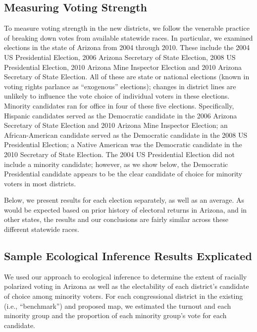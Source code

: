 \documentclass[12pt]{scrartcl}
\begin{document}
\subsection{Measuring Voting Strength}

To measure voting strength in the new districts, we follow the
venerable practice of breaking down votes from available statewide
races.  In particular, we examined elections in the state of Arizona
from 2004 through 2010. These include the 2004 US Presidential
Election, 2006 Arizona Secretary of State Election, 2008 US
Presidential Election, 2010 Arizona Mine Inspector Election and 2010
Arizona Secretary of State Election.  All of these are state or
national elections (known in voting rights parlance as ``exogenous''
elections); changes in district lines are unlikely to influence the
vote choice of individual voters in these elections. Minority
candidates ran for office in four of these five elections.
Specifically, Hispanic candidates served as the Democratic candidate
in the 2006 Arizona Secretary of State Election and 2010 Arizona Mine
Inspector Election; an African-American candidate served as the
Democratic candidate in the 2008 US Presidential Election; a Native
American was the Democratic candidate in the 2010 Secretary of State
Election. The 2004 US Presidential Election did not include a minority
candidate; however, as we show below, the Democratic Presidential
candidate appears to be the clear candidate of choice for minority
voters in most districts.  

Below, we present results for each election separately, as well as an
average.  As would be expected based on prior history of electoral
returns in Arizona, and in other states, the results and our
conclusions are fairly similar across these different statewide races.

\subsection{Sample Ecological Inference Results Explicated}

We used our approach to ecological inference to determine the extent
of racially polarized voting in Arizona as well as the electability of
each district's candidate of choice among minority voters. For each
congressional district in the existing (i.e., ``benchmark'') and
proposed map, we estimated the turnout and each minority group and the
proportion of each minority group's vote for each candidate. 
\end{document}
